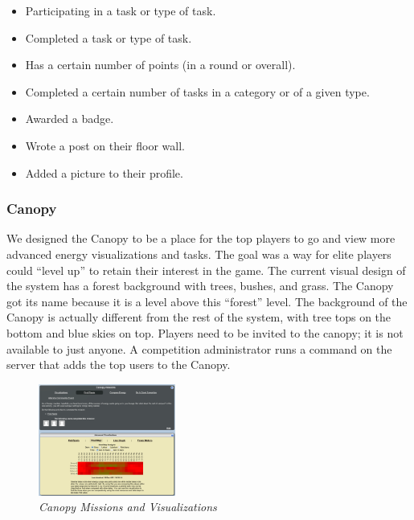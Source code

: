 \documentclass{acm_proc_article-sp}
\begin{document}
\begin{itemize}
  \item Participating in a task or type of task.
  \item Completed a task or type of task.
  \item Has a certain number of points (in a round or overall).
  \item Completed a certain number of tasks in a category or of a given type.
  \item Awarded a badge.
  \item Wrote a post on their floor wall.
  \item Added a picture to their profile.
\end{itemize}

\subsubsection{Canopy}

We designed the Canopy to be a place for the top players to go and view more advanced energy visualizations and tasks. The goal was a way for elite players could ``level up'' to retain their interest in the game. The current visual design of the system has a forest background with trees, bushes, and grass. The Canopy got its name because it is a level above this ``forest'' level. The background of the Canopy is actually different from the rest of the system, with tree tops on the bottom and blue skies on top. Players need to be invited to the canopy; it is not available to just anyone. A competition administrator runs a command on the server that adds the top users to the Canopy.

\begin{figure}[ht!]
  \center
  \includegraphics[width=0.4\textwidth]{canopy-missions-visualizations.eps}
  \caption{\em \small Canopy Missions and Visualizations}
  \label{fig:CanopyMissions}
\end{figure}
\end{document}
